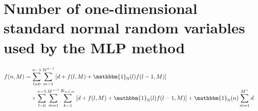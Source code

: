 \documentclass[a4paper,12pt]{article}
\providecommand{\1}{\mathbbm{1}}
\providecommand{\N}{\mathbb{N}}
\newcommand{\Zz}{Z}
\DeclarePairedDelimiter{\pr}()
\DeclarePairedDelimiter{\br}[]
\newcommand{\bpr}[1]{\pr[\big]{#1}}
\newcommand{\bbpr}[1]{\pr[\Big]{#1}}
\newcommand{\bbbbr}[1]{\br[\bigg]{#1}}
\newcommand{\bbbbbr}[1]{\br[\Bigg]{#1}}
\newcommand{\dindex}{\mathfrak{i}}
\begin{document}
\section{Number of one-dimensional standard normal random variables used by the MLP method}
\begin{equation}
	\begin{split}
    f(n,M) &= \sum_{l=0}^{n-1}
		\sum_{m=1}^{M^{n-l}}\left[
    d %
    + f(l,M)
    + \mathbbm{1}_\N(l) f(l-1,M)\right] \\
    &\quad +
    \sum_{l=0}^{n-1}
		\sum_{m=1}^{M^{n-l}} 
		\sum_{k=1}^{K_{n,l,m}}\left[
		d
    + f(l,M)
    + \mathbbm{1}_\N(l) f(l-1,M)\right]
    + \mathbbm{1}_\N(n) \sum_{m=1}^{M^n} d
	\end{split}
\end{equation}
\end{document}
